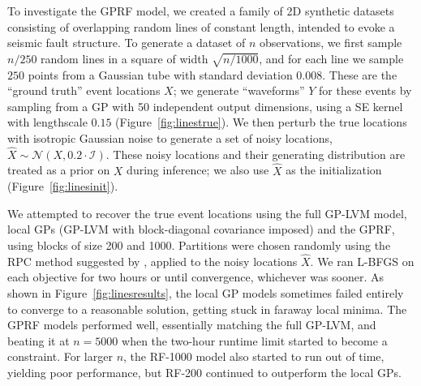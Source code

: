 \documentclass{article}
\newcommand{\N}{\mathcal{N}}
\begin{document}
To investigate the GPRF model, we created a family of 2D synthetic
datasets consisting of overlapping random lines of constant length,
intended to evoke a seismic fault structure. 
To generate a dataset of $n$ observations, we first sample $n/250$
random  lines in a square of width $\sqrt{n/1000}$, and for each line 
we sample $250$ points from a Gaussian tube with standard deviation 0.008. 
These are the ``ground truth''
event locations $X$; we generate ``waveforms'' $Y$ for these events by sampling
from a GP with 50 independent output dimensions, using a SE kernel
with lengthscale $0.15$ (Figure~\ref{fig:linestrue}). We then perturb the
true locations with isotropic Gaussian noise to generate a set of noisy
locations, $\hat{X} \sim \N(X, 0.2\cdot \mathcal{I})$. These noisy locations and
their generating distribution are treated as a prior on $X$ during
inference; we also use $\hat{X}$ as the initialization  (Figure~\ref{fig:linesinit}). 

We attempted to recover the true event locations using the full GP-LVM
model, local GPs (GP-LVM with block-diagonal covariance imposed) and
the GPRF, using blocks of size 200 and 1000. Partitions were chosen randomly
using the RPC method suggested by \cite{chalupka2012}, applied to the
noisy locations $\hat{X}$. We ran L-BFGS on each objective for two
hours or until convergence, whichever was sooner. As shown in
Figure~\ref{fig:linesresults}, the local GP models sometimes failed
entirely to converge to a reasonable solution, getting stuck in
faraway local minima. The GPRF models performed well, essentially
matching the full GP-LVM, and beating it at $n=5000$ when the two-hour
runtime limit started to become a constraint. For larger $n$, the
RF-1000 model also started to run out of time, yielding poor
performance, but RF-200 continued to outperform the local GPs. 
\end{document}
